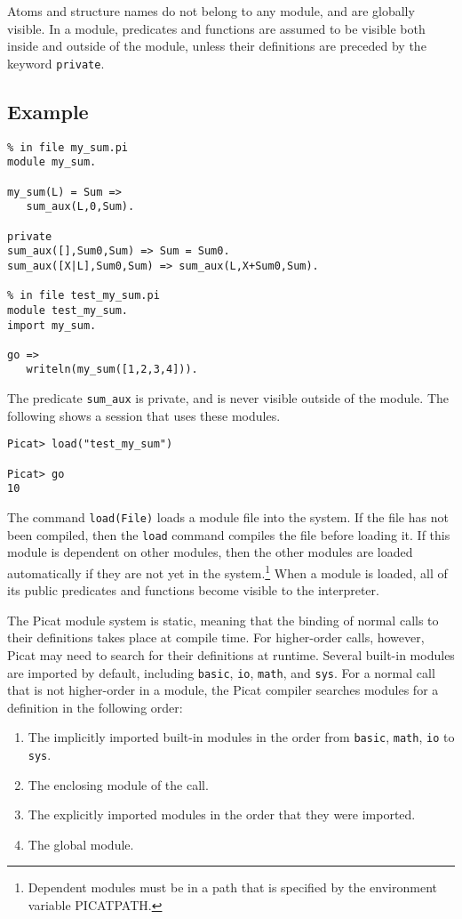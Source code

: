 Atoms and structure names do not belong to any module, and are globally visible. In a module, predicates and functions are assumed to be visible both inside and outside of the module, unless their definitions are preceded by the keyword \texttt{private}. 

\subsection*{Example}
\begin{verbatim}
% in file my_sum.pi
module my_sum.

my_sum(L) = Sum =>
   sum_aux(L,0,Sum).

private
sum_aux([],Sum0,Sum) => Sum = Sum0.
sum_aux([X|L],Sum0,Sum) => sum_aux(L,X+Sum0,Sum).

% in file test_my_sum.pi
module test_my_sum.
import my_sum.

go =>
   writeln(my_sum([1,2,3,4])).
\end{verbatim}

The predicate \texttt{sum\_aux} is private, and is never visible outside of the module. The following shows a session that uses these modules. 
\begin{verbatim}
Picat> load("test_my_sum")

Picat> go
10
\end{verbatim}
The command \texttt{load(File)} loads a module file into the system. If the file has not been compiled, then the \texttt{load} command compiles the file before loading it. If this module is dependent on other modules, then the other modules are loaded automatically if they are not yet in the system.\footnote{Dependent modules must be in a path that is specified by the environment variable PICATPATH.} When a module is loaded, all of its public predicates and functions become visible to the interpreter.

The Picat module system is static, meaning that the binding of normal calls to their definitions takes place at compile time. For higher-order calls, however, Picat may need to search for their definitions at runtime. Several built-in modules are imported by default, including  \texttt{basic}, \texttt{io}, \texttt{math},  and \texttt{sys}. For a normal call that is not higher-order in a module, the Picat compiler searches modules for a definition in the following order:
\begin{enumerate}
\item The implicitly imported built-in modules in the order from \texttt{basic}, \texttt{math}, \texttt{io} to \texttt{sys}.
\item The enclosing module of the call.
\item The explicitly imported modules in the order that they were imported.
\item The global module.
\end{enumerate}

